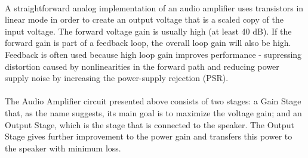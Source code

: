 \paragraph{} 
A straightforward analog implementation of an audio amplifier uses transistors in linear mode in order to create an output voltage that is a scaled copy of the input voltage. The forward voltage gain is usually high (at least 40 dB). If the forward gain is part of a feedback loop, the overall loop gain will also be high. Feedback is often used because high loop gain improves performance - supressing distortion caused by nonlinearities in the forward path and reducing power supply noise by increasing the power-supply rejection (PSR).

\paragraph{}
The Audio Amplifier circuit presented above consists of two stages: a Gain Stage that, as the name suggests, its main goal is to maximize the voltage gain; and an Output Stage, which is the stage that is connected to the speaker. The Output Stage gives further improvement to the power gain and transfers this power to the speaker with minimum loss.

\pagebreak

